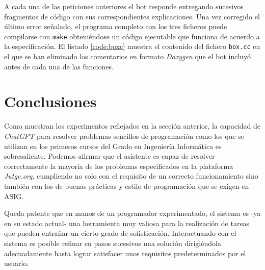 \documentclass[twocolumn,twoside,a4paper, 10pt]{article}
\newcommand{\jutge}{\textit{Jutge.org}{}}           %
\newcommand{\ChatGPT}{\textit{ChatGPT}{}}           %
\begin{document}
%
A cada una de las peticiones anteriores el bot responde entregando sucesivos fragmentos de código con sus correspondientes 
explicaciones.
Una vez corregido el último error señalado, el programa completo con los tres ficheros puede compilarse con
\texttt{make} obteniéndose un código ejecutable que funciona de acuerdo a la especificación.
El listado \ref{code:boxc} muestra el contenido del fichero \texttt{box.cc} en el que se han eliminado los comentarios
en formato \textit{Doxygen} que el bot incluyó antes de cada una de las funciones.

\section{Conclusiones}
Como muestran los experimentos reflejados en la sección anterior, la capacidad de \ChatGPT{} para resolver problemas sencillos
de programación como los que se utilizan en los primeros cursos del Grado en Ingeniería Informática es
sobresaliente.
Podemos afirmar que el asistente es capaz de resolver correctamente la mayoría de los problemas especificados en
la plataforma \jutge{}, cumpliendo no solo con el requisito de un correcto funcionamiento sino también con los
de buenas prácticas y estilo de programación que se exigen en ASIG.

Queda patente que en manos de un programador experimentado, el sistema es -ya en su estado actual- una
herramienta muy valiosa para la realización de tareas que pueden entrañar un cierto grado de sofisticación.
Interactuando con el sistema es posible refinar en pasos sucesivos una solución dirigiéndola adecuadamente
hasta lograr satisfacer unos requisitos predeterminados por el usuario.
\end{document}
